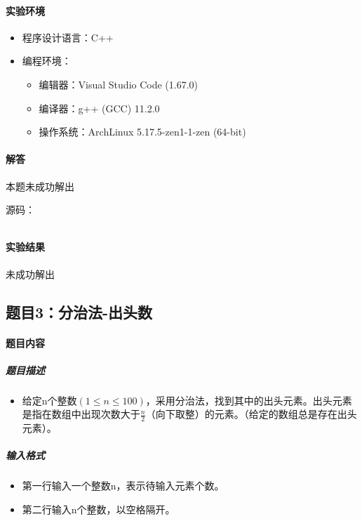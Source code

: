 \documentclass[12pt,a4paper]{ctexart}
\begin{document}
\vspace{5pt}

\paragraph{实验环境}
\begin{itemize}
    \item 程序设计语言：C++
    \item 编程环境：
    \begin{itemize}
        \item 编辑器：Visual Studio Code (1.67.0)
        \item 编译器：g++ (GCC) 11.2.0
        \item 操作系统：ArchLinux 5.17.5-zen1-1-zen (64-bit)
    \end{itemize}
\end{itemize}

\vspace{5pt}

\paragraph{解答} 本题未成功解出

源码：
\inputminted[bgcolor=codebg,frame=lines,autogobble,linenos=true,breaklines]{cpp}{src/t2.cpp}

\vspace{5pt}

\paragraph{实验结果}
未成功解出

\newpage

\subsection*{题目3：分治法-出头数}
\paragraph{题目内容}
\subparagraph{题目描述}

\begin{itemize}
    \item 给定n个整数$(1 \leq n \leq 100)$，采用分治法，找到其中的出头元素。出头元素是指在数组中出现次数大于$\frac{n}{2}$（向下取整）的元素。（给定的数组总是存在出头元素）。
\end{itemize}

\subparagraph{输入格式}
    \begin{itemize}
        \item 第一行输入一个整数n，表示待输入元素个数。
        \item 第二行输入n个整数，以空格隔开。
    \end{itemize}
\end{document}
